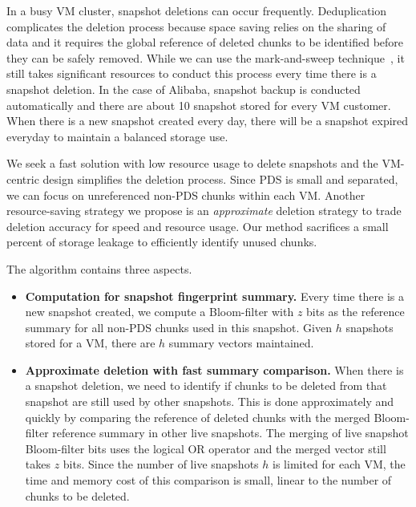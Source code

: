 \begin{itemize}
In a busy VM cluster, snapshot deletions can occur frequently.
Deduplication complicates the deletion process because space saving relies on the sharing of data
and it requires the global reference of deleted chunks to be identified before  they can be safely removed.
While we can use the mark-and-sweep technique~\cite{Guo2011}, 
it still takes significant resources to conduct this process every time there is a snapshot deletion.
In the case of Alibaba, snapshot backup is conducted automatically and there are 
about 10 snapshot stored for every VM customer. When there is
a new snapshot created every day,  there will be  a snapshot expired everyday to maintain
a balanced storage use. 

We seek a fast solution with low resource usage to delete snapshots and
the VM-centric design simplifies the deletion process. 
Since PDS is small and separated, we can focus on  unreferenced non-PDS chunks within each VM. 
Another resource-saving strategy we propose is
an {\em approximate} deletion strategy to trade deletion accuracy for
speed and resource usage. Our method sacrifices a small percent of storage leakage
to efficiently identify unused chunks.

The algorithm contains three aspects.

\begin{itemize}
\item {\bf Computation for snapshot fingerprint summary.}
Every time there is a new snapshot created,
we compute a Bloom-filter with $z$ bits as the reference summary for all non-PDS chunks used 
in this snapshot. Given $h$ snapshots stored for a VM, there are $h$ summary vectors maintained.

\item {\bf Approximate deletion with fast summary comparison.}
When there is a snapshot deletion,  
we need to identify if  chunks to be deleted from that snapshot
are still used by other snapshots. 
This is done approximately and quickly by comparing the 
reference of deleted chunks  with
the merged Bloom-filter reference summary in other live snapshots.
The merging of live snapshot Bloom-filter bits uses the logical OR operator 
and the merged vector still takes $z$ bits.
Since the number of live snapshots $h$ is limited for
each VM, 
the time and memory cost of this comparison is small, linear to the number of chunks to be deleted.


\end{itemize}
\end{itemize}
